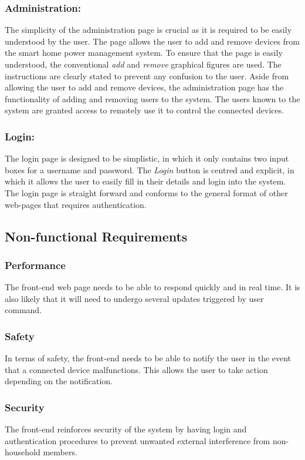 \documentclass[10pt,twocolumn]{witseiepaper}
\begin{document}
	\subsubsection{Administration:}
	The simplicity of the administration page is crucial as it is required to be easily understood by the user. The page allows the user to add and remove devices from the smart home power management system. To ensure that the page is easily understood, the conventional \textit{add} and \textit{remove} graphical figures are used. The instructions are clearly stated to prevent any confusion to the user. Aside from allowing the user to add and remove devices, the administration page has the functionality of adding and removing users to the system. The users known to the system are granted access to remotely use it to control the connected devices.
	
	\subsubsection{Login:}
	The login page is designed to be simplistic, in which it only contains two input boxes for a username and password. The \textit{Login} button is centred and explicit, in which it allows the user to easily fill in their details and login into the system. The login page is straight forward and conforms to the general format of other web-pages that requires authentication.
	
	\subsection{Non-functional Requirements}
	\subsubsection{Performance}
	The front-end web page needs to be able to respond quickly and in real time. It is also likely that it will need to undergo several updates triggered by user command.
	\subsubsection{Safety}
	In terms of safety, the front-end needs to be able to notify the user in the event that a connected device malfunctions. This allows the user to take action depending on the notification.
	\subsubsection{Security}
	The front-end reinforces security of the system by having login and authentication procedures to prevent unwanted external interference from non-household members.
\end{document}
